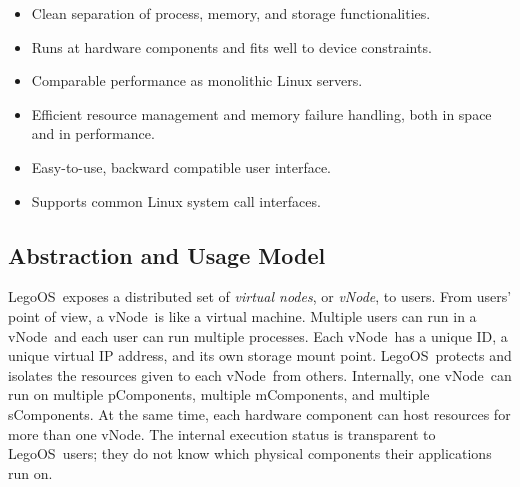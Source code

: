 \documentclass[10pt,times,twocolumn]{z2-article}
\renewcommand{\em}{\it}
\newcommand{\lego}{LegoOS}
\newcommand{\vnode}{vNode}
\newcommand{\vip}{vIP}
\newcommand{\vmount}{vMount}
\newcommand{\pcomponent}{pComponent}
\newcommand{\mcomponent}{mComponent}
\newcommand{\scomponent}{sComponent}
\begin{document}
{{{{{{{{\begin{itemize}

\vspace{-0.1in}

\item Clean separation of process, memory, and storage functionalities.
\vspace{-0.1in}

\item Runs at hardware components and fits well to device constraints.
\vspace{-0.1in}

\item Comparable performance as monolithic Linux servers.
\vspace{-0.1in}

\item Efficient resource management and memory failure handling, both in space and in performance. %
\vspace{-0.1in}

\item Easy-to-use, backward compatible user interface.
\vspace{-0.1in}

\item Supports common Linux system call interfaces.
\vspace{-0.1in}

\end{itemize}

\subsection{Abstraction and Usage Model}
\lego\ exposes a distributed set of {\em virtual nodes}, or {\em \vnode}, to users.
From users' point of view, a \vnode\ is like a virtual machine. 
Multiple users can run in a \vnode\ and each user can run multiple processes.
Each \vnode\ has a unique ID, a unique virtual IP address, %
and its own storage mount point. %
\lego\ protects and isolates the resources given to each \vnode\ from others.
Internally, one \vnode\ can run on multiple \pcomponent{}s, multiple \mcomponent{}s,
and multiple \scomponent{}s.
At the same time, each hardware component can host resources for more than one \vnode.
The internal execution status is transparent to \lego\ users;
they do not know which physical components their applications run on.

}}}}}}}}
\end{document}
